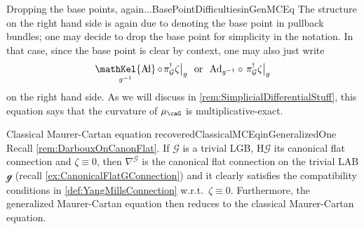 \documentclass[reqno,a4paper,oneside]{amsart}
\newcommand\mutot{\mu_\caG}
\theoremstyle{plain}
\theoremstyle{remark}
\theoremstyle{definition}
\def\bas#1\eas{\begin{align*}#1\end{align*}}
\DeclareMathOperator{\sAd}{\mathKel{A\mkern-5.5mu d}}
\begin{document}
\begin{remarks}{Dropping the base points, again...}{BasePointDifficultiesinGenMCEq}
The structure on the right hand side is again due to denoting the base point in pullback bundles; one may decide to drop the base point for simplicity in the notation. In that case, since the base point is clear by context, one may also just write
\begin{equation*}
\sAd_{g^{-1}} \circ \mleft.\pi_{\mathcal{G}}^!\zeta\mright|_g
~\text{ or }~
\mathrm{Ad}_{g^{-1}} \circ \mleft.\pi_{\mathcal{G}}^!\zeta\mright|_g
\end{equation*}
on the right hand side. As we will discuss in \ref{rem:SimplicialDifferentialStuff}, this equation says that the curvature of $\mutot$ is multiplicative-exact.
%
\end{remarks}

\begin{remarks}{Classical Maurer-Cartan equation recovered}{ClassicalMCEqinGeneralizedOne}
Recall \ref{rem:DarbouxOnCanonFlat}. If $\mathcal{G}$ is a trivial LGB, $\mathrm{H}\mathcal{G}$ its canonical flat connection and $\zeta \equiv 0$, then $\nabla^{\mathcal{G}}$ is the canonical flat connection on the trivial LAB $\mathcal{g}$ (recall \ref{ex:CanonicalFlatGConnection}) and it clearly satisfies the compatibility conditions in \ref{def:YangMillsConnection} w.r.t.\ $\zeta \equiv 0$. Furthermore, the generalized Maurer-Cartan equation then reduces to the classical Maurer-Cartan equation.
\end{remarks}
\end{document}
